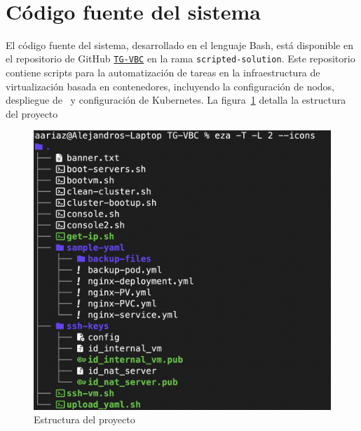 \label{cap:pmv}
\mbox{}\\
\section{Código fuente del sistema}
\noindent
El código fuente del sistema, desarrollado en el lenguaje Bash, está disponible en el repositorio de GitHub \href{https://github.com/AariazP/TG-VBC.git}{\texttt{TG-VBC}} en la rama \texttt{scripted-solution}. Este repositorio contiene scripts para la automatización de tareas en la infraestructura de virtualización basada en contenedores, incluyendo la configuración de nodos, despliegue de \VM\ y configuración de Kubernetes. 
La figura~\ref{fig:estructura-proyecto} detalla la estructura del proyecto
\begin{figure}[H]
    \centering
    \includegraphics[scale=0.2]{tablas-images/cp6/src/tree.png}
    \caption{Estructura del proyecto}\label{fig:estructura-proyecto}
\end{figure}

